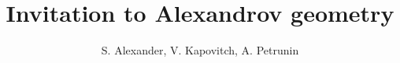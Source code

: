 \documentclass[twoside]{book}
\begin{document}
\frontmatter
\title{Invitation to Alexandrov geometry}
\author{S. Alexander, V. Kapovitch, A. Petrunin}
\maketitle







{\small

}

\end{document}
